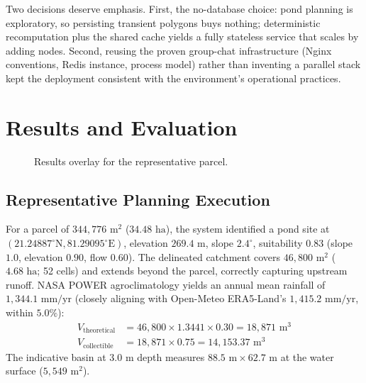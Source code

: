 \documentclass[manuscript,screen,review]{acmart}
\begin{document}
Two decisions deserve emphasis. First, the no-database choice: pond planning is exploratory, so persisting transient polygons buys nothing; deterministic recomputation plus the shared cache yields a fully stateless service that scales by adding nodes. Second, reusing the proven group-chat infrastructure (Nginx conventions, Redis instance, process model) rather than inventing a parallel stack kept the deployment consistent with the environment's operational practices.

\section{Results and Evaluation}
\label{sec:results}

\begin{figure}[h]
  \centering
  \caption{Results overlay for the representative parcel.}
  \label{fig:results}
\end{figure}

\subsection{Representative Planning Execution}
For a parcel of $344{,}776\text{ m}^2$ ($34.48\text{ ha}$), the system identified a pond site at $(21.24887^\circ\text{N}, 81.29095^\circ\text{E})$, elevation $269.4\text{ m}$, slope $2.4^\circ$, suitability $0.83$ (slope $1.0$, elevation $0.90$, flow $0.60$). The delineated catchment covers $46{,}800\text{ m}^2$ ($4.68\text{ ha}$; 52 cells) and extends beyond the parcel, correctly capturing upstream runoff. NASA POWER agroclimatology yields an annual mean rainfall of $1{,}344.1\text{ mm/yr}$ (closely aligning with Open-Meteo ERA5-Land's $1{,}415.2\text{ mm/yr}$, within $5.0\%$):
\begin{align*}
    V_{\text{theoretical}} &= 46{,}800 \times 1.3441 \times 0.30 = 18{,}871\text{ m}^3 \\
    V_{\text{collectible}} &= 18{,}871 \times 0.75 = 14{,}153.37\text{ m}^3
\end{align*}
The indicative basin at $3.0\text{ m}$ depth measures $88.5\text{ m} \times 62.7\text{ m}$ at the water surface ($5{,}549\text{ m}^2$).
\end{document}
